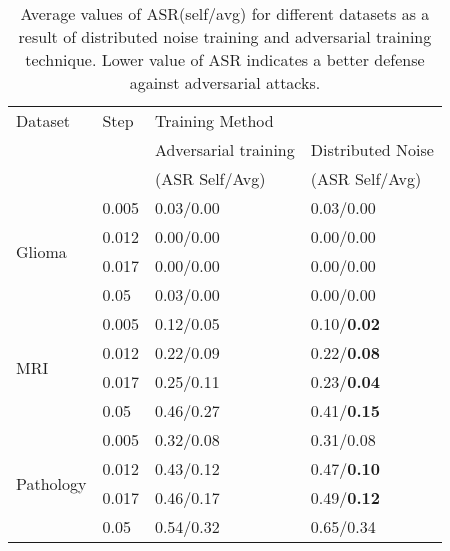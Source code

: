 \begin{table}[]
    \centering
    \caption{Average values of ASR(self/avg) for different datasets as a result of distributed noise training and adversarial training technique. Lower value of ASR indicates a better defense against adversarial attacks.}
    \label{tab:my_label}
    \begin{tabular}{|l|l|l|l|}
\hline
Dataset & Step & \multicolumn{2}{l|}{Training Method} \\
& & Adversarial training & Distributed Noise \\
&& (ASR Self/Avg)& (ASR Self/Avg)\\\hline
\multirow{4}{*}{Glioma} & 0.005 & 0.03/0.00 & 0.03/0.00 \\ 
& 0.012 & 0.00/0.00 & 0.00/0.00 \\ 
& 0.017 & 0.00/0.00 & 0.00/0.00 \\ 
& 0.05 & 0.03/0.00 & 0.00/0.00 \\ \hline
\multirow{4}{*}{MRI} & 0.005 & 0.12/0.05 & 0.10/\textbf{0.02} \\ 
& 0.012 & 0.22/0.09 & 0.22/\textbf{0.08} \\ 
& 0.017 & 0.25/0.11 & 0.23/\textbf{0.04} \\ 
& 0.05 & 0.46/0.27 & 0.41/\textbf{0.15} \\ \hline
\multirow{4}{*}{Pathology} & 0.005 & 0.32/0.08 & 0.31/0.08 \\ 
& 0.012 & 0.43/0.12 & 0.47/\textbf{0.10} \\ 
& 0.017 & 0.46/0.17 & 0.49/\textbf{0.12} \\ 
& 0.05 & 0.54/0.32 & 0.65/0.34 \\ \hline
\end{tabular}
\end{table}

